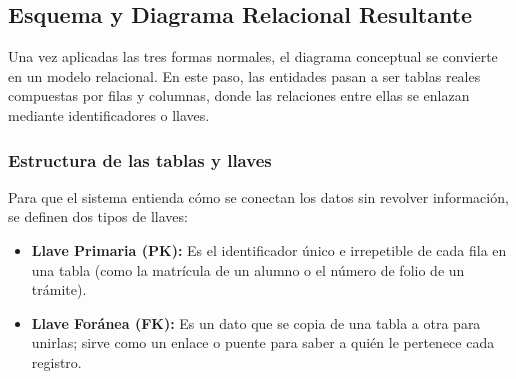 \subsection{Esquema y Diagrama Relacional Resultante}
Una vez aplicadas las tres formas normales, el diagrama conceptual se convierte en un modelo relacional. En este paso, las entidades pasan a ser tablas reales compuestas por filas y columnas, donde las relaciones entre ellas se enlazan mediante identificadores o llaves.

\subsubsection{Estructura de las tablas y llaves}
Para que el sistema entienda cómo se conectan los datos sin revolver información, se definen dos tipos de llaves:
\begin{itemize}
    \item \textbf{Llave Primaria (PK):} Es el identificador único e irrepetible de cada fila en una tabla (como la matrícula de un alumno o el número de folio de un trámite).
    \item \textbf{Llave Foránea (FK):} Es un dato que se copia de una tabla a otra para unirlas; sirve como un enlace o puente para saber a quién le pertenece cada registro.
\end{itemize}

